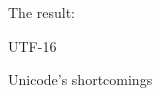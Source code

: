 \documentclass[../index.tex]{subfiles}
\begin{document}
\begin{frame}{\currenttitle}
\end{frame}

\begin{frame}[fragile]{\currenttitle}
  

  \vspace*{1em}

  The result:

  
\end{frame}

\renewcommand{\currenttitle}{UTF-16}
\begin{frame}{\currenttitle}
\end{frame}

\renewcommand{\currenttitle}{Unicode's shortcomings}
\begin{frame}{\currenttitle}
\end{frame}

\end{document}
